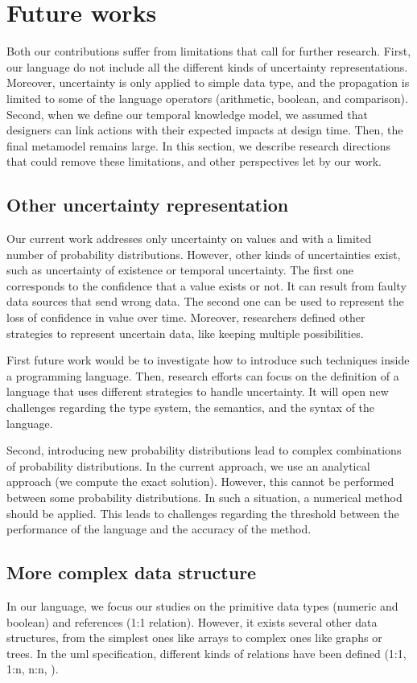 \section{Future works}
Both our contributions suffer from limitations that call for further research.
First, our language \langName{} do not include all the different kinds of uncertainty representations.
Moreover, uncertainty is only applied to simple data type, and the propagation is limited to some of the language operators (arithmetic, boolean, and comparison).
Second, when we define our temporal knowledge model, we assumed that designers can link actions with their expected impacts at design time.
Then, the final \gls{metamodel} remains large.
In this section, we describe research directions that could remove these limitations, and other perspectives let by our work.


\subsection{Other uncertainty representation}
Our current work addresses only uncertainty on values and with a limited number of probability distributions.
However, other kinds of uncertainties exist, such as uncertainty of existence or temporal uncertainty.
The first one corresponds to the confidence that a value exists or not.
It can result from faulty data sources that send wrong data.
The second one can be used to represent the loss of confidence in value over time.
Moreover, researchers defined other strategies to represent uncertain data, like keeping multiple possibilities.

First future work would be to investigate how to introduce such techniques inside a programming language.
Then, research efforts can focus on the definition of a language that uses different strategies to handle uncertainty.
It will open new challenges regarding the type system, the semantics, and the syntax of the language.

Second, introducing new probability distributions lead to complex combinations of probability distributions.
In the current approach, we use an analytical approach (we compute the exact solution).
However, this cannot be performed between some probability distributions.
In such a situation, a numerical method should be applied.
This leads to challenges regarding the threshold between the performance of the language and the accuracy of the method.

\subsection{More complex data structure}
In our language, we focus our studies on the primitive data types (numeric and boolean) and references (1:1 relation).
However, it exists several other data structures, from the simplest ones like arrays to complex ones like graphs or trees.
In the \gls{uml} specification, different kinds of relations have been defined (1:1, 1:n, n:n, \etc).

